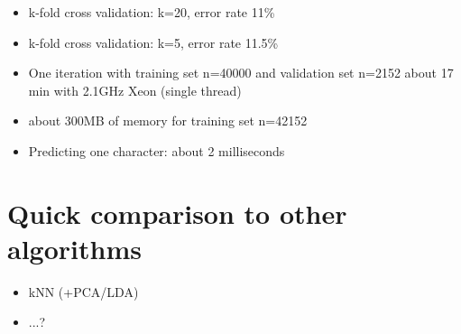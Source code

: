 \documentclass{netsec2012}
\begin{document}
\label{ref:datachallenge}

\begin{itemize}
\item k-fold cross validation: k=20, error rate 11\%
\item k-fold cross validation: k=5, error rate 11.5\%
\item One iteration with training set n=40000 and validation set n=2152 about 17 min with 2.1GHz Xeon (single thread)
\item about 300MB of memory for training set n=42152
\item Predicting one character: about 2 milliseconds

\end{itemize}

\section{Quick comparison to other algorithms}

\begin{itemize}
\item kNN (+PCA/LDA)
\item ...?
\end{itemize}


\cite{albanese12mlpy}



\end{document}
